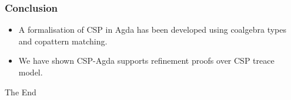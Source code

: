 \documentclass{beamer}
\begin{document}

\begin{frame}
\frametitle{Conclusion}
\begin{itemize}
\item  A formalisation of CSP in Agda has been developed using coalgebra types and copattern matching.  

\item We have shown CSP-Agda supports refinement proofs over CSP treace model.
\end{itemize}
\end{frame}









\begin{frame}

\end{frame} 

\begin{frame}
\Huge{\centerline{The End}}
\end{frame}
\end{document}
